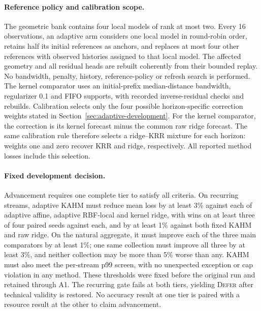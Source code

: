 \paragraph{Reference policy and calibration scope.}
The geometric bank contains four local models of rank at most two. Every
16 observations, an adaptive arm considers one local model in round-robin
order, retains half its initial references as anchors, and replaces at most
four other references with observed histories assigned to that local model.
The affected geometry and all residual heads are rebuilt coherently from
their bounded replay. No bandwidth, penalty, history, reference-policy or
refresh search is performed. The kernel comparator uses an initial-prefix
median-distance bandwidth, regularizer 0.1 and FIFO supports, with recorded
inverse-residual checks and rebuilds. Calibration selects only the four
possible horizon-specific correction weights stated in
Section~\ref{sec:adaptive-development}.
For the kernel comparator, the correction is its kernel forecast minus
the common raw ridge forecast. The same calibration rule therefore selects
a ridge--KRR mixture for each horizon: weights one and zero recover KRR
and ridge, respectively. All reported method losses include this selection.

\paragraph{Fixed development decision.}
Advancement requires one complete tier to satisfy all criteria. On recurring
streams, adaptive KAHM must reduce mean loss by at least 3\% against each
of adaptive affine, adaptive RBF-local and kernel ridge, with wins on at
least three of four paired seeds against each, and by at least 1\% against
both fixed KAHM and raw ridge. On the natural aggregate, it must improve
each of the three main comparators by at least 1\%; one same collection
must improve all three by at least 3\%, and neither collection may be more
than 5\% worse than any. KAHM must also meet the per-stream p99 screen,
with no unexpected exception or cap violation in any method. These
thresholds were fixed before the original run and retained through A1.
The recurring gate fails at both tiers, yielding \textsc{Defer} after
technical validity is restored. No accuracy result at one tier is paired
with a resource result at the other to claim advancement.



